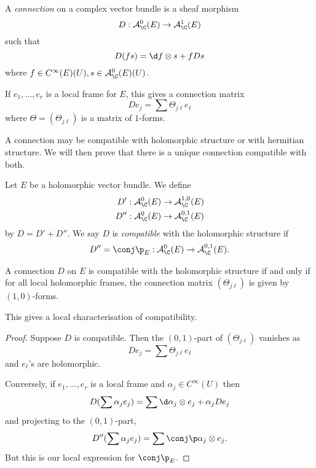 \documentclass[a4paper]{article}
\begin{document}
\begin{definition}[connection]
  A \emph{connection} on a complex vector bundle is a sheaf morphism
  \[
    D: \mathcal A_\C^0(E) \to \mathcal A_\C^1(E)
  \]
  such that
  \[
    D(fs) = \d f \otimes s + f Ds
  \]
  where \(f \in C^\infty(E)(U), s \in \mathcal A_\C^0(E)(U)\).
\end{definition}
If \(e_1, \dots, e_r\) is a local frame for \(E\), this gives a connection matrix
\[
  D e_j = \sum \Theta_{j\ell} e_\ell
\]
where \(\Theta = (\Theta_{j\ell})\) is a matrix of \(1\)-forms.

A connection may be compatible with holomorphic structure or with hermitian structure. We will then prove that there is a unique connection compatible with both.

\begin{definition}
  Let \(E\) be a holomorphic vector bundle. We define
  \begin{align*}
    D': \mathcal A_\C^0(E) &\to \mathcal A_\C^{1, 0}(E) \\
    D'': \mathcal A_\C^0(E) &\to \mathcal A_\C^{0, 1}(E)
  \end{align*}
  by \(D = D' + D''\). We say \(D\) is \emph{compatible} with the holomorphic structure if
  \[
    D'' = \conj \p_E: \mathcal A_\C^0(E) \to \mathcal A_\C^{0, 1}(E).
  \]
\end{definition}

\begin{proposition}
  A connection \(D\) on \(E\) is compatible with the holomorphic structure if and only if for all local holomorphic frames, the connection matrix \((\Theta_{j\ell})\) is given by \((1, 0)\)-forms.
\end{proposition}
This gives a local characterisation of compatibility.

\begin{proof}
  Suppose \(D\) is compatible. Then the \((0, 1)\)-part of \((\Theta_{j\ell})\) vanishes as
  \[
    D e_j = \sum \Theta_{j\ell} e_\ell
  \]
  and \(e_\ell\)'s are holomorphic.

  Conversely, if \(e_1, \dots, e_r\) is a local frame and \(\alpha_j \in C^\infty(U)\) then
  \[
    D(\sum \alpha_j e_j) = \sum \d \alpha_j \otimes e_j + \alpha_j D e_j
  \]
  and projecting to the \((0, 1)\)-part,
  \[
    D''(\sum \alpha_j e_j) = \sum \conj \p \alpha_j \otimes e_j.
  \]
  But this is our local expression for \(\conj \p_E\).
\end{proof}
\end{document}
